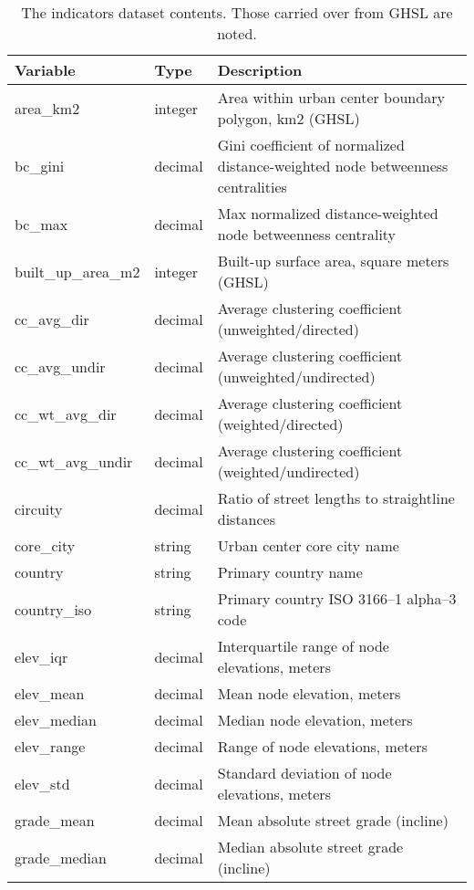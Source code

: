 \documentclass[12pt,letterpaper]{article} %
\begin{document}
\begin{table}[htbp]
    \centering
    \footnotesize
    \caption{The indicators dataset contents. Those carried over from GHSL are noted.}\label{tab:indicators}
    \begin{tabular}{p{3.8cm} p{1.2cm} p{7.6cm}}
        \toprule
        Variable                      & Type    & Description \\
        \midrule
        area\_km2 & integer & Area within urban center boundary polygon, km2 (GHSL) \\
        bc\_gini & decimal & Gini coefficient of normalized distance-weighted node betweenness centralities \\
        bc\_max & decimal & Max normalized distance-weighted node betweenness centrality \\
        built\_up\_area\_m2 & integer & Built-up surface area, square meters (GHSL) \\
        cc\_avg\_dir & decimal & Average clustering coefficient (unweighted/directed) \\
        cc\_avg\_undir & decimal & Average clustering coefficient (unweighted/undirected) \\
        cc\_wt\_avg\_dir & decimal & Average clustering coefficient (weighted/directed) \\
        cc\_wt\_avg\_undir & decimal & Average clustering coefficient (weighted/undirected) \\
        circuity & decimal & Ratio of street lengths to straightline distances \\
        core\_city & string & Urban center core city name \\
        country & string & Primary country name \\
        country\_iso & string & Primary country ISO 3166--1 alpha--3 code \\
        elev\_iqr & decimal & Interquartile range of node elevations, meters \\
        elev\_mean & decimal & Mean node elevation, meters \\
        elev\_median & decimal & Median node elevation, meters \\
        elev\_range & decimal & Range of node elevations, meters \\
        elev\_std & decimal & Standard deviation of node elevations, meters \\
        grade\_mean & decimal & Mean absolute street grade (incline) \\
        grade\_median & decimal & Median absolute street grade (incline) \\

\end{tabular}
\end{table}
\end{document}
